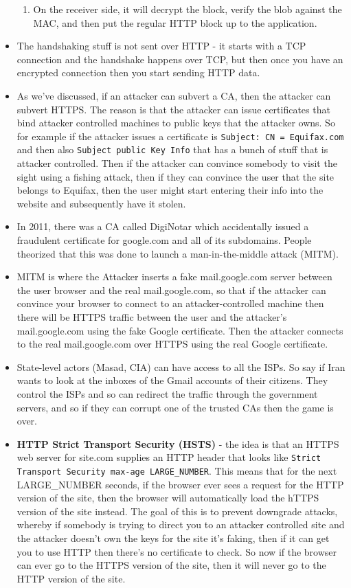 \documentclass[12pt]{article}
\theoremstyle{definition}
\begin{document}
\begin{itemize}
\begin{enumerate}
        \item On the receiver side, it will decrypt the block, verify the blob against the MAC, and then put the regular HTTP block up to the application.
    \end{enumerate}
    \item The handshaking stuff is not sent over HTTP - it starts with a TCP connection and the handshake happens over TCP, but then once you have an encrypted connection then you start sending HTTP data.
    \item As we've discussed, if an attacker can subvert a CA, then the attacker can subvert HTTPS. The reason is that the attacker can issue certificates that bind attacker controlled machines to public keys that the attacker owns. So for example if the attacker issues a certificate is \texttt{Subject: CN = Equifax.com} and then also \texttt{Subject public Key Info} that has a bunch of stuff that is attacker controlled. Then if the attacker can convince somebody to visit the sight using a fishing attack, then if they can convince the user that the site belongs to Equifax, then the user might start entering their info into the website and subsequently have it stolen.
    \item In 2011, there was a CA called DigiNotar which accidentally issued a fraudulent certificate for google.com and all of its subdomains. People theorized that this was done to launch a man-in-the-middle attack (MITM).
    \item MITM is where the Attacker inserts a fake mail.google.com server between the user browser and the real mail.google.com, so that if the attacker can convince your browser to connect to an attacker-controlled machine then there will be HTTPS traffic between the user and the attacker's mail.google.com using the fake Google certificate. Then the attacker connects to the real mail.google.com over HTTPS using the real Google certificate.
    \item State-level actors (Masad, CIA) can have access to all the ISPs. So say if Iran wants to look at the inboxes of the Gmail accounts of their citizens. They control the ISPs and so can redirect the traffic through the government servers, and so if they can corrupt one of the trusted CAs then the game is over.
    \item \textbf{HTTP Strict Transport Security (HSTS)} - the idea is that an HTTPS web server for site.com supplies an HTTP header that looks like \texttt{Strict Transport Security max-age LARGE\_NUMBER}. This means that for the next LARGE\_NUMBER seconds, if the browser ever sees a request for the HTTP version of the site, then the browser will automatically load the hTTPS version of the site instead. The goal of this is to prevent downgrade attacks, whereby if somebody is trying to direct you to an attacker controlled site and the attacker doesn't own the keys for the site it's faking, then if it can get you to use HTTP then there's no certificate to check. So now if the browser can ever go to the HTTPS version of the site, then it will never go to the HTTP version of the site.

\end{itemize}
\end{document}
